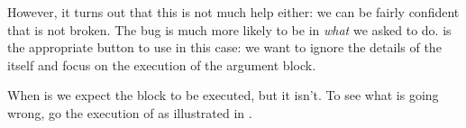 \documentclass[a4paper,10pt,twoside]{book}
\begin{document}


However, it turns out that this is not much help either: we can be fairly confident that  is not broken.  The bug is much more likely to be in \emph{what} we asked \pharo to do.
 is the appropriate button to use in this case: we want to ignore the details of the  itself and focus on the execution of the argument block. 


When  is  we expect the  block to be executed, but it isn't.
To see what is going wrong, go  the execution of  as illustrated in .
\end{document}
